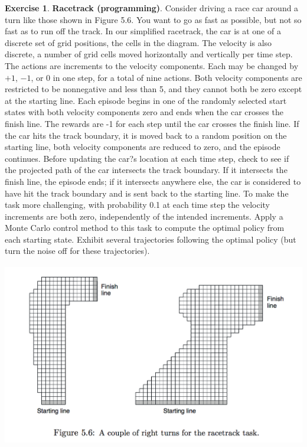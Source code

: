 \documentclass[oneside,11pt]{article}
\theoremstyle{definition}
\newtheorem{exer}[thm]{Exercise}
\begin{document}
\begin{exer}

\textbf{Racetrack (programming)}. Consider driving a race car around a turn like those shown in Figure 5.6. You want to go as fast as possible, but not so fast as to run off the track. In our simplified racetrack, the car is at one of a discrete set of grid positions, the cells in the diagram. The velocity is also discrete, a number of grid cells moved horizontally and vertically per time step. The actions are increments to the velocity components. Each may be changed by $+1$, $-1$, or $0$ in one step, for a total of nine actions. Both velocity components are restricted to be nonnegative and less than 5, and they cannot both be zero except at the starting line. Each episode begins in one of the randomly selected start states with both velocity components zero and ends when the car crosses the finish line. The rewards are -1 for each step until the car crosses the finish line. If the car hits the track boundary, it is moved back to a random position on the starting line, both velocity components are reduced to zero, and the episode continues. Before updating the car?s location at each time step, check to see if the projected path of the car intersects the track boundary. If it intersects the finish line, the episode ends; if it intersects anywhere else, the car is considered to have hit the track boundary and is sent back to the starting line. To make the task more challenging, with probability 0.1 at each time step the velocity increments are both zero, independently of the intended increments. Apply a Monte Carlo control method to this task to compute the optimal policy from each starting state. Exhibit several trajectories following the optimal policy (but turn the noise off for these trajectories).


\includegraphics[width=14cm, height=8cm]{exer_5_8}


\end{exer}
\end{document}
